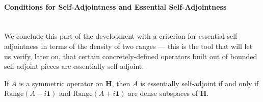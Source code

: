 \paragraph{Conditions for Self-Adjointness and Essential Self-Adjointness}\mbox{}\\
We conclude this part of the development with a criterion for essential self-adjointness in terms of the density of two ranges — this is the tool that will let us verify, later on, that certain concretely-defined operators built out of bounded self-adjoint pieces are essentially self-adjoint.

\begin{theorem}
    \label{thrm:hall-9.21}
    \leanok
    If $A$ is a symmetric operator on $\mathbf{H}$, then $A$ is essentially self-adjoint if and only if $\text{Range}(A - i\mathbf{1})$ and $\text{Range}(A + i\mathbf{1})$ are dense subspaces of $\mathbf{H}$.
\end{theorem}

